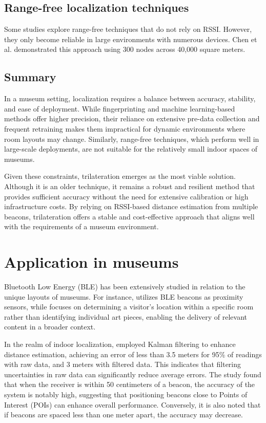 \subsection{Range-free localization techniques}

Some studies explore range-free techniques that do not rely on RSSI. However, they only become reliable in large environments with numerous devices. Chen et al. \cite{chen_range-free_2013} demonstrated this approach using 300 nodes across 40,000 square meters.  

\subsection{Summary}

In a museum setting, localization requires a balance between accuracy, stability, and ease of deployment. While fingerprinting and machine learning-based methods offer higher precision, their reliance on extensive pre-data collection and frequent retraining makes them impractical for dynamic environments where room layouts may change. Similarly, range-free techniques, which perform well in large-scale deployments, are not suitable for the relatively small indoor spaces of museums.  

Given these constraints, trilateration emerges as the most viable solution. Although it is an older technique, it remains a robust and resilient method that provides sufficient accuracy without the need for extensive calibration or high infrastructure costs. By relying on RSSI-based distance estimation from multiple beacons, trilateration offers a stable and cost-effective approach that aligns well with the requirements of a museum environment.

\section{Application in museums}

Bluetooth Low Energy (BLE) has been extensively studied in relation to the unique layouts of museums. For instance, \cite{barsocchi_detecting_2021} utilizes BLE beacons as proximity sensors, while \cite{verde_indoor_2023} focuses on determining a visitor's location within a specific room rather than identifying individual art pieces, enabling the delivery of relevant content in a broader context. 

In the realm of indoor localization, \cite{spachos_ble_2020} employed Kalman filtering to enhance distance estimation, achieving an error of less than 3.5 meters for 95\% of readings with raw data, and 3 meters with filtered data. This indicates that filtering uncertainties in raw data can significantly reduce average errors. The study found that when the receiver is within 50 centimeters of a beacon, the accuracy of the system is notably high, suggesting that positioning beacons close to Points of Interest (POIs) can enhance overall performance. Conversely, it is also noted that if beacons are spaced less than one meter apart, the accuracy may decrease.